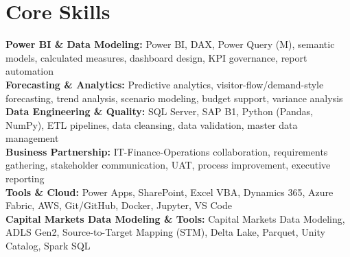 \documentclass[10.5pt,letterpaper]{article}
\begin{document}
\section{Core Skills}
\noindent
\textbf{Power BI \& Data Modeling:} Power BI, DAX, Power Query (M), semantic models, calculated measures, dashboard design, KPI governance, report automation\\\textbf{Forecasting \& Analytics:} Predictive analytics, visitor-flow/demand-style forecasting, trend analysis, scenario modeling, budget support, variance analysis\\\textbf{Data Engineering \& Quality:} SQL Server, SAP B1, Python (Pandas, NumPy), ETL pipelines, data cleansing, data validation, master data management\\\textbf{Business Partnership:} IT-Finance-Operations collaboration, requirements gathering, stakeholder communication, UAT, process improvement, executive reporting\\\textbf{Tools \& Cloud:} Power Apps, SharePoint, Excel VBA, Dynamics 365, Azure Fabric, AWS, Git/GitHub, Docker, Jupyter, VS Code\\\textbf{Capital Markets Data Modeling \& Tools:} Capital Markets Data Modeling, ADLS Gen2, Source-to-Target Mapping (STM), Delta Lake, Parquet, Unity Catalog, Spark SQL
\end{document}
